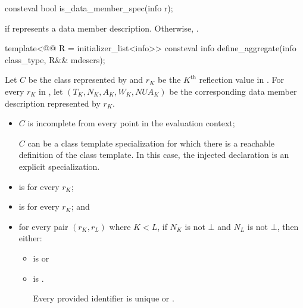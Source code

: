 %
\begin{itemdecl}
consteval bool is_data_member_spec(info r);
\end{itemdecl}

\begin{itemdescr}
\pnum
\returns
{} if  represents a data member description.
Otherwise, .
\end{itemdescr}

%
\begin{itemdecl}
template<@@ R = initializer_list<info>>
  consteval info define_aggregate(info class_type, R&& mdescrs);
\end{itemdecl}

\begin{itemdescr}
\pnum
Let $C$ be the class represented by 
and $r_K$ be the $K^\text{th}$ reflection value in .
For every $r_K$ in ,
let $(T_K, N_K, A_K, W_K, \mathit{NUA}_K)$ be
the corresponding data member description represented by $r_K$.

\pnum
\constantwhen
\begin{itemize}
\item
  $C$ is incomplete from every point in the evaluation context;
  \begin{note}
  $C$ can be a class template specialization
  for which there is a reachable definition of the class template.
  In this case,
  the injected declaration is an explicit specialization.
  \end{note}
\item
   is  for every $r_K$;
\item
   is  for every $r_K$; and
\item
  for every pair $(r_K, r_L)$ where $K < L$,
  if $N_K$ is not $\bot$ and $N_L$ is not $\bot$,
  then either:
  \begin{itemize}
  \item
     is  or
  \item
     is .
    \begin{note}
    Every provided identifier is unique or .
    \end{note}
  \end{itemize}
\end{itemize}


\end{itemdescr}
